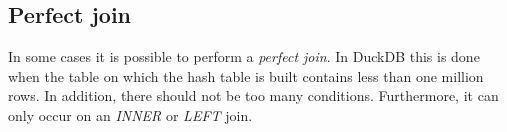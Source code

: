 \subsection{Perfect join}
In some cases it is possible to perform a \textit{perfect join}. In DuckDB this is done when the table on which the hash table is built contains less than one million rows. In addition, there should not be too many conditions. Furthermore, it can only occur on an \textit{INNER} or \textit{LEFT} join. 